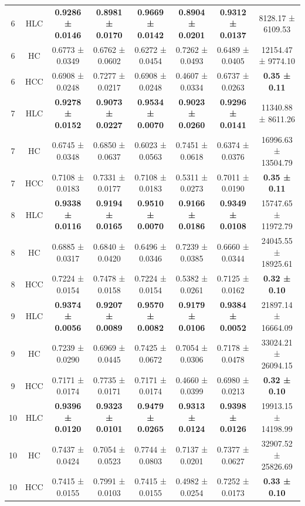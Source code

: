 \begin{table}[!ht]
{\begin{tabular}{|c|c|c|c|c|c|c|c|}
\hline
6 & HLC & \textbf{0.9286 ± 0.0146} & \textbf{0.8981 ± 0.0170} & \textbf{0.9669 ± 0.0142} & \textbf{0.8904 ± 0.0201} & \textbf{0.9312 ± 0.0137} & 8128.17 ± 6109.53 \\
6 & HC & 0.6773 ± 0.0349 & 0.6762 ± 0.0602 & 0.6272 ± 0.0454 & 0.7262 ± 0.0493 & 0.6489 ± 0.0405 & 12154.47 ± 9774.10 \\
6 & HCC & 0.6908 ± 0.0248 & 0.7277 ± 0.0217 & 0.6908 ± 0.0248 & 0.4607 ± 0.0334 & 0.6737 ± 0.0263 & \textbf{0.35 ± 0.11} \\
\hline
7 & HLC & \textbf{0.9278 ± 0.0152} & \textbf{0.9073 ± 0.0227} & \textbf{0.9534 ± 0.0070} & \textbf{0.9023 ± 0.0260} & \textbf{0.9296 ± 0.0141} & 11340.88 ± 8611.26 \\
7 & HC & 0.6745 ± 0.0348 & 0.6850 ± 0.0637 & 0.6023 ± 0.0563 & 0.7451 ± 0.0618 & 0.6374 ± 0.0376 & 16996.63 ± 13504.79 \\
7 & HCC & 0.7108 ± 0.0183 & 0.7331 ± 0.0177 & 0.7108 ± 0.0183 & 0.5311 ± 0.0273 & 0.7011 ± 0.0190 & \textbf{0.35 ± 0.11} \\
\hline
8 & HLC & \textbf{0.9338 ± 0.0116} & \textbf{0.9194 ± 0.0165} & \textbf{0.9510 ± 0.0070} & \textbf{0.9166 ± 0.0186} & \textbf{0.9349 ± 0.0108} & 15747.65 ± 11972.79 \\
8 & HC & 0.6885 ± 0.0317 & 0.6840 ± 0.0420 & 0.6496 ± 0.0346 & 0.7239 ± 0.0385 & 0.6660 ± 0.0344 & 24045.55 ± 18925.61 \\
8 & HCC & 0.7224 ± 0.0154 & 0.7478 ± 0.0158 & 0.7224 ± 0.0154 & 0.5382 ± 0.0261 & 0.7125 ± 0.0162 & \textbf{0.32 ± 0.10} \\
\hline
9 & HLC & \textbf{0.9374 ± 0.0056} & \textbf{0.9207 ± 0.0089} & \textbf{0.9570 ± 0.0082} & \textbf{0.9179 ± 0.0106} & \textbf{0.9384 ± 0.0052} & 21897.14 ± 16664.09 \\
9 & HC & 0.7239 ± 0.0290 & 0.6969 ± 0.0445 & 0.7425 ± 0.0672 & 0.7054 ± 0.0306 & 0.7178 ± 0.0478 & 33024.21 ± 26094.15 \\
9 & HCC & 0.7171 ± 0.0174 & 0.7735 ± 0.0171 & 0.7171 ± 0.0174 & 0.4660 ± 0.0399 & 0.6980 ± 0.0213 & \textbf{0.32 ± 0.10} \\
\hline
10 & HLC & \textbf{0.9396 ± 0.0120} & \textbf{0.9323 ± 0.0101} & \textbf{0.9479 ± 0.0265} & \textbf{0.9313 ± 0.0124} & \textbf{0.9398 ± 0.0126} & 19913.15 ± 14198.99 \\
10 & HC & 0.7437 ± 0.0424 & 0.7054 ± 0.0523 & 0.7744 ± 0.0803 & 0.7137 ± 0.0201 & 0.7377 ± 0.0627 & 32907.52 ± 25826.69 \\
10 & HCC & 0.7415 ± 0.0155 & 0.7991 ± 0.0103 & 0.7415 ± 0.0155 & 0.4982 ± 0.0254 & 0.7252 ± 0.0173 & \textbf{0.33 ± 0.10} \\
\hline
\end{tabular}
}%
\end{table}



